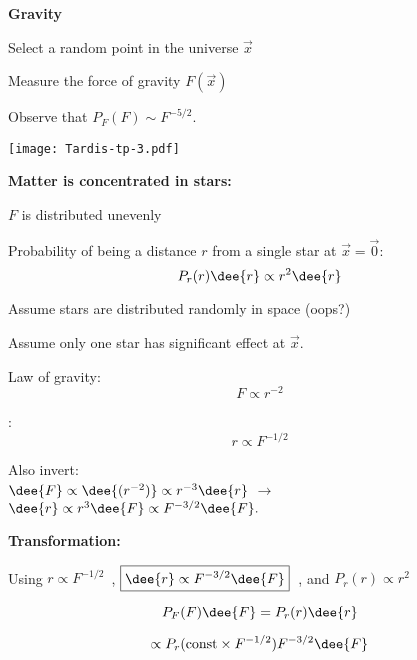 
  \textbf{Gravity}
  
      
    
    
     
      Select a random point in the universe $\vec{x}$
     
      Measure the force of gravity $F(\vec{x})$
     
      Observe that $P_F(F) \sim F^{-5/2}$.
    
    
    
    \texttt{[image: Tardis-tp-3.pdf]}
  



  \textbf{Matter is concentrated in stars:\cite{sornette2003a}}
    
     
      $F$ is distributed unevenly
     
      Probability of being a distance $r$ from a
      single star at $\vec{x} = \vec{0}$:
      $$ P_r(r) \dee{r} \propto r^{2} \dee{r} $$
     
      Assume stars are distributed randomly in space (oops?)
     
      Assume only one star has significant effect at $\vec{x}$.
     
      Law of gravity: $$ F \propto r^{-2} $$
     
      : $$ r \propto F^{-1/2} $$
    
      Also invert:\\
      $ \dee{F} \propto \dee{(r^{-2})} \propto r^{-3} \dee{r} $
      $\rightarrow $
      $ \dee{r} \propto r^3 \dee{F} \propto F^{-3/2} \dee{F}.$
    
  


  \textbf{Transformation:}

  
    Using
    $\boxed{r \propto F^{-1/2}}$\ ,
    $\boxed{\dee{r} \propto F^{-3/2} \dee{F}}$\ ,
    and
    $\boxed{P_r(r) \propto r^{2}}$
    
     
      $$ P_F(F)\dee{F} = P_r(r) \dee{r} $$
     
      $$  \propto P_r(\mbox{const} \times F^{-1/2}) F^{-3/2} \dee{F} $$
     
